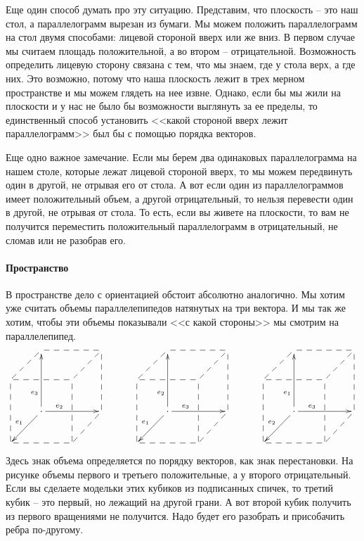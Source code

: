 Еще один способ думать про эту ситуацию. Представим, что плоскость -- это наш стол, а параллелограмм вырезан из бумаги. Мы можем положить параллелограмм на стол двумя способами: лицевой стороной вверх или же вниз. В первом случае мы считаем площадь положительной, а во втором -- отрицательной. Возможность определить лицевую сторону связана с тем, что мы знаем, где у стола верх, а где них. Это возможно, потому что наша плоскость лежит в трех мерном пространстве и мы можем глядеть на нее извне. Однако, если бы мы жили на плоскости и у нас не было бы возможности выглянуть за ее пределы, то единственный способ установить <<какой стороной вверх лежит параллелограмм>> был бы с помощью порядка векторов.

Еще одно важное замечание. Если мы берем два одинаковых параллелограмма на нашем столе, которые лежат лицевой стороной вверх, то мы можем передвинуть один в другой, не отрывая его от стола. А вот если один из параллелограммов имеет положительный объем, а другой отрицательный, то нельзя перевести один в другой, не отрывая от стола. То есть, если вы живете на плоскости, то вам не получится переместить положительный параллелограмм в отрицательный, не сломав или не разобрав его.

\paragraph{Пространство}

В пространстве дело с ориентацией обстоит абсолютно аналогично. Мы хотим уже считать объемы параллелепипедов натянутых на три вектора. И мы так же хотим, чтобы эти объемы показывали <<с какой стороны>> мы смотрим на параллелепипед.
\[
\xymatrix{
	{}&{}\ar@{--}[rr]\ar@{--}[dl]&{}&{}\ar@{--}[dl]\\
	{}\ar@{--}[rr]&{}&{}&{}\\
	{}&{\cdot}\ar[uu]^(.3){e_3}\ar[rr]^(.3){e_2}\ar[dl]_{e_1}&{}&{}\ar@{--}[dl]\ar@{--}[uu]\\
	{}\ar@{--}[rr]\ar@{--}[uu]&{}&{}\ar@{--}[uu]&{}\\
}
\quad\quad\quad
\xymatrix{
	{}&{}\ar@{--}[rr]\ar@{--}[dl]&{}&{}\ar@{--}[dl]\\
	{}\ar@{--}[rr]&{}&{}&{}\\
	{}&{\cdot}\ar[uu]^(.3){e_2}\ar[rr]^(.3){e_3}\ar[dl]_{e_1}&{}&{}\ar@{--}[dl]\ar@{--}[uu]\\
	{}\ar@{--}[rr]\ar@{--}[uu]&{}&{}\ar@{--}[uu]&{}\\
}
\quad\quad\quad
\xymatrix{
	{}&{}\ar@{--}[rr]\ar@{--}[dl]&{}&{}\ar@{--}[dl]\\
	{}\ar@{--}[rr]&{}&{}&{}\\
	{}&{\cdot}\ar[uu]^(.3){e_1}\ar[rr]^(.3){e_3}\ar[dl]_{e_2}&{}&{}\ar@{--}[dl]\ar@{--}[uu]\\
	{}\ar@{--}[rr]\ar@{--}[uu]&{}&{}\ar@{--}[uu]&{}\\
}
\]
Здесь знак объема определяется по порядку векторов, как знак перестановки. На рисунке объемы первого и третьего положительные, а у второго отрицательный. Если вы сделаете модельки этих кубиков из подписанных спичек, то третий кубик -- это первый, но лежащий на другой грани. А вот второй кубик получить из первого вращениями не получится. Надо будет его разобрать и присобачить ребра по-другому. 


